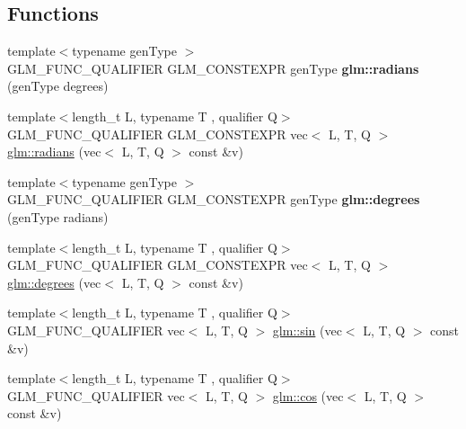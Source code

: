 \subsection*{Functions}
\begin{DoxyCompactItemize}
\item 
\mbox{\label{func__trigonometric_8inl_a00577ee752441c79d5bb11d7c29e1627}} 
{\footnotesize template$<$typename gen\+Type $>$ }\\G\+L\+M\+\_\+\+F\+U\+N\+C\+\_\+\+Q\+U\+A\+L\+I\+F\+I\+ER G\+L\+M\+\_\+\+C\+O\+N\+S\+T\+E\+X\+PR gen\+Type {\bfseries glm\+::radians} (gen\+Type degrees)
\item 
{\footnotesize template$<$length\+\_\+t L, typename T , qualifier Q$>$ }\\G\+L\+M\+\_\+\+F\+U\+N\+C\+\_\+\+Q\+U\+A\+L\+I\+F\+I\+ER G\+L\+M\+\_\+\+C\+O\+N\+S\+T\+E\+X\+PR vec$<$ L, T, Q $>$ \hyperlink{group__core__func__trigonometric_ga6e1db4862c5e25afd553930e2fdd6a68}{glm\+::radians} (vec$<$ L, T, Q $>$ const \&v)
\item 
\mbox{\label{func__trigonometric_8inl_a8a6fe45ac1da0ac1023bab706a675413}} 
{\footnotesize template$<$typename gen\+Type $>$ }\\G\+L\+M\+\_\+\+F\+U\+N\+C\+\_\+\+Q\+U\+A\+L\+I\+F\+I\+ER G\+L\+M\+\_\+\+C\+O\+N\+S\+T\+E\+X\+PR gen\+Type {\bfseries glm\+::degrees} (gen\+Type radians)
\item 
{\footnotesize template$<$length\+\_\+t L, typename T , qualifier Q$>$ }\\G\+L\+M\+\_\+\+F\+U\+N\+C\+\_\+\+Q\+U\+A\+L\+I\+F\+I\+ER G\+L\+M\+\_\+\+C\+O\+N\+S\+T\+E\+X\+PR vec$<$ L, T, Q $>$ \hyperlink{group__core__func__trigonometric_ga8faec9e303538065911ba8b3caf7326b}{glm\+::degrees} (vec$<$ L, T, Q $>$ const \&v)
\item 
{\footnotesize template$<$length\+\_\+t L, typename T , qualifier Q$>$ }\\G\+L\+M\+\_\+\+F\+U\+N\+C\+\_\+\+Q\+U\+A\+L\+I\+F\+I\+ER vec$<$ L, T, Q $>$ \hyperlink{group__core__func__trigonometric_ga29747fd108cb7292ae5a284f69691a69}{glm\+::sin} (vec$<$ L, T, Q $>$ const \&v)
\item 
{\footnotesize template$<$length\+\_\+t L, typename T , qualifier Q$>$ }\\G\+L\+M\+\_\+\+F\+U\+N\+C\+\_\+\+Q\+U\+A\+L\+I\+F\+I\+ER vec$<$ L, T, Q $>$ \hyperlink{group__core__func__trigonometric_ga6a41efc740e3b3c937447d3a6284130e}{glm\+::cos} (vec$<$ L, T, Q $>$ const \&v)

\end{DoxyCompactItemize}
